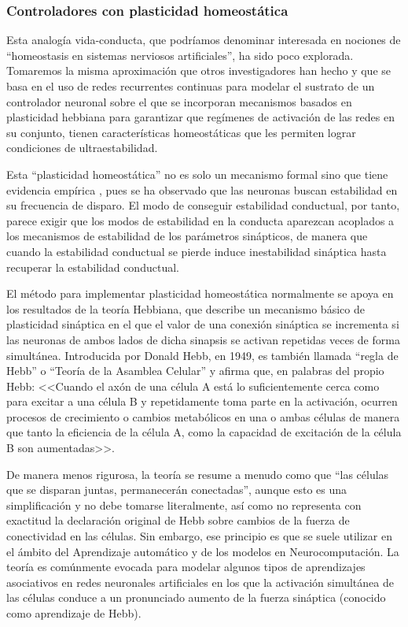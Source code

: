 \subsubsection{Controladores con plasticidad homeostática}
Esta analogía vida-conducta, que podríamos denominar interesada en nociones de ``homeostasis en sistemas nerviosos artificiales'', ha sido poco explorada\cite{DiPaolo_1, DiPaolo_2, DiPaolo_3, MathayomchanBeer,HoinvilleHenaff}. Tomaremos la misma aproximación que otros investigadores han hecho y que se basa en el uso de redes recurrentes continuas para modelar el sustrato de un controlador neuronal sobre el que se incorporan mecanismos basados en plasticidad hebbiana para garantizar que regímenes de activación de las redes en su conjunto, tienen características homeostáticas que les permiten lograr condiciones de ultraestabilidad.

Esta ``plasticidad homeostática'' no es solo un mecanismo formal sino que tiene evidencia empírica \cite{TurrigianoGG}, pues se ha observado que las neuronas buscan estabilidad en su frecuencia de disparo. El modo de conseguir estabilidad conductual, por tanto, parece exigir que los modos de estabilidad en la conducta aparezcan acoplados a los mecanismos de estabilidad de los parámetros sinápticos, de manera que cuando la estabilidad conductual se pierde induce inestabilidad sináptica hasta recuperar la estabilidad conductual.


El método para implementar plasticidad homeostática normalmente se apoya en los resultados de la teoría Hebbiana, que describe un mecanismo básico de plasticidad sináptica en el que el valor de una conexión sináptica se incrementa si las neuronas de ambos lados de dicha sinapsis se activan repetidas veces de forma simultánea. Introducida por Donald Hebb, en 1949, es también llamada ``regla de Hebb'' o ``Teoría de la Asamblea Celular'' y afirma que, en palabras del propio Hebb: <<Cuando el axón de una célula A está lo suficientemente cerca como para excitar a una célula B y repetidamente toma parte en la activación, ocurren procesos de crecimiento o cambios metabólicos en una o ambas células de manera que tanto la eficiencia de la célula A, como la capacidad de excitación de la célula B son aumentadas>>.

De manera menos rigurosa, la teoría se resume a menudo como que ``las células que se disparan juntas, permanecerán conectadas'', aunque esto es una simplificación y no debe tomarse literalmente, así como no representa con exactitud la declaración original de Hebb sobre cambios de la fuerza de conectividad en las células. Sin embargo, ese principio es que se suele utilizar en el ámbito del Aprendizaje automático y de los modelos en Neurocomputación. La teoría es comúnmente evocada para modelar algunos tipos de aprendizajes asociativos en redes neuronales artificiales en los que la activación simultánea de las células conduce a un pronunciado aumento de la fuerza sináptica (conocido como aprendizaje de Hebb).

